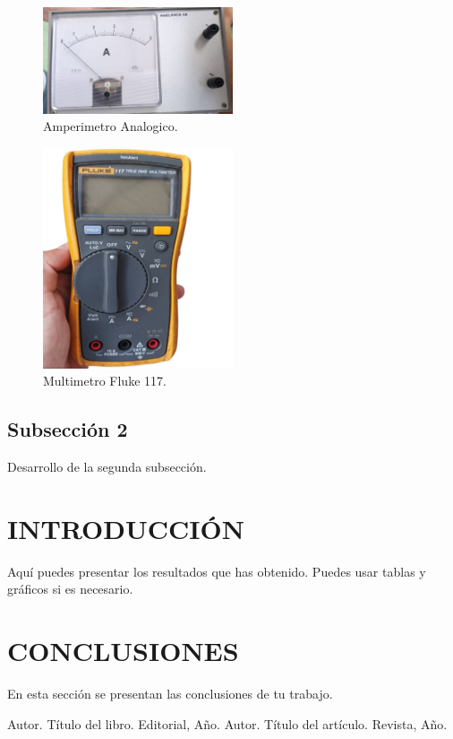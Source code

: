 \documentclass[a4paper,12pt]{article} %
\begin{document}
\begin{figure}[h] %
    \centering
    \includegraphics[width=0.5\textwidth]{img/Amperimetro Analogico.png} %
    \caption{Amperimetro Analogico.}
    \label{fig:AmpAnalogico}
\end{figure}



\begin{figure}[h] %
    \centering
    \includegraphics[width=0.5\textwidth]{img/Multimetro digital.png} %
    \caption{Multimetro Fluke 117.}
    \label{fig:MulDigital}
\end{figure}





\subsection{Subsección 2}
Desarrollo de la segunda subsección.

\section{INTRODUCCIÓN }
Aquí puedes presentar los resultados que has obtenido. Puedes usar tablas y gráficos si es necesario.

\section{CONCLUSIONES}
En esta sección se presentan las conclusiones de tu trabajo.

\begin{thebibliography}{99}
 Autor. Título del libro. Editorial, Año.
 Autor. Título del artículo. Revista, Año.
\end{thebibliography}
\end{document}
